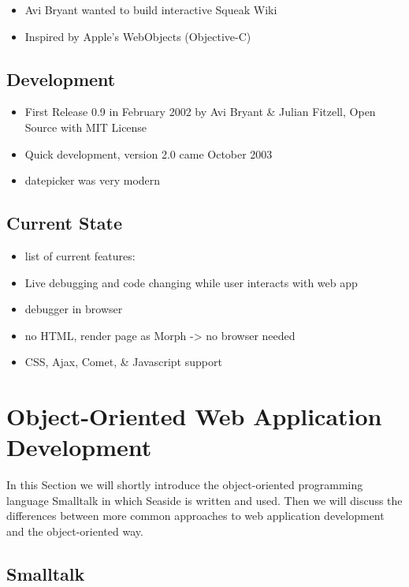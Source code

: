 \documentclass[a4paper,12pt,pagesize,headsepline,bibtotoc,titlepage]{scrartcl}
\begin{document}
\begin{itemize}
\item Avi Bryant wanted to build interactive Squeak Wiki
\item Inspired by Apple’s WebObjects (Objective-C)
\end{itemize}

\subsection{Development}
\label{sec:dev} 


\begin{itemize}
\item First Release 0.9 in February 2002 by Avi Bryant \& Julian Fitzell, Open Source with MIT License
\item Quick development, version 2.0 came October 2003
\item datepicker was very modern
\end{itemize}

\subsection{Current State}
\label{sec:current} 

\begin{itemize}
\item list of current features:
\item Live debugging and code changing while user interacts with web app
\item debugger in browser
\item no HTML, render page as Morph -> no browser needed
\item CSS, Ajax, Comet, \& Javascript support
\end{itemize}

\section{Object-Oriented Web Application Development}

In this Section we will shortly introduce the object-oriented programming language Smalltalk in which Seaside is written and used. Then we will discuss the differences between more common approaches to web application development and the object-oriented way.

\subsection{Smalltalk}
\end{document}
